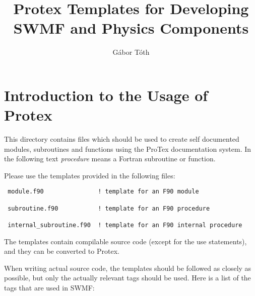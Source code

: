 \documentclass[10pt]{article}
\title{Protex Templates for Developing SWMF and Physics Components}
\author{G\'abor T\'oth}
\begin{document}
\maketitle

\section{Introduction to the Usage of Protex}

This directory contains files which should be used to create self documented
modules, subroutines and functions using the ProTex documentation system.
In the following text {\it procedure} means a Fortran subroutine or function.

Please use the templates provided in the following files:
\begin{verbatim}
 module.f90               ! template for an F90 module

 subroutine.f90           ! template for an F90 procedure

 internal_subroutine.f90  ! template for an F90 internal procedure
\end{verbatim}
The templates contain compilable source code (except for the use statements), 
and they can be converted to Protex. 

When writing actual source code, the templates should be followed as closely 
as possible, but only the actually relevant tags should be used.
Here is a list of the tags that are used in SWMF:

\newpage
\end{document}
